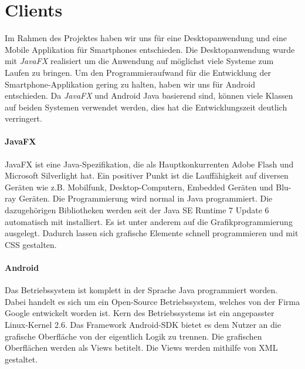 
\chapter{Clients}
Im Rahmen des Projektes haben wir uns für eine Desktopanwendung und eine Mobile Applikation für Smartphones entschieden. Die Desktopanwendung wurde mit \textit{JavaFX} realisiert um die Anwendung auf möglichst viele Systeme zum Laufen zu bringen. Um den Programmieraufwand für die Entwicklung der Smartphone-Applikation gering zu halten, haben wir uns für Android entschieden. Da \textit{JavaFX} und Android Java basierend sind, können viele Klassen auf beiden Systemen verwendet werden, dies hat die Entwicklungszeit deutlich verringert.

\subsubsection{JavaFX}
JavaFX ist eine Java-Spezifikation, die als Hauptkonkurrenten Adobe Flash und Microsoft Silverlight hat. Ein positiver Punkt ist die Lauffähigkeit auf diversen Geräten wie z.B. Mobilfunk, Desktop-Computern, Embedded Geräten und Blu-ray Geräten. Die Programmierung wird normal in Java programmiert. Die dazugehörigen Bibliotheken werden seit der Java SE Runtime 7 Update 6 automatisch mit installiert. Es ist unter anderem auf die Grafikprogrammierung ausgelegt. Dadurch lassen sich grafische Elemente schnell programmieren und mit CSS gestalten\cite{bib.jFXRaspPi}.

\subsubsection{Android}
Das Betriebssystem ist komplett in der Sprache Java programmiert worden. Dabei handelt es sich um ein Open-Source Betriebssystem, welches von der Firma Google entwickelt worden ist. Kern des Betriebssystems ist ein angepasster Linux-Kernel 2.6. Das Framework Android-SDK bietet es dem Nutzer an die grafische Oberfläche von der eigentlich Logik zu trennen. Die grafischen Oberflächen werden als Views betitelt. Die Views werden mithilfe von XML gestaltet.
\newpage
